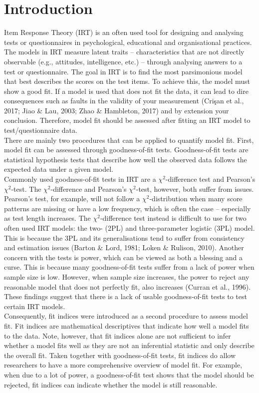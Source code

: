 \documentclass[Royal,sageapa,times,doublespace]{sagej}
\begin{document}
\section{Introduction}
Item Response Theory (IRT) is an often used tool for designing and analysing tests or questionnaires in psychological, educational and organisational practices. The models in IRT measure latent traits -- characteristics that are not directly observable (e.g., attitudes, intelligence, etc.) -- through analysing answers to a test or questionnaire. The goal in IRT is to find the most parsimonious model that best describes the scores on the test items. To achieve this, the model must show a good fit. If a model is used that does not fit the data, it can lead to dire consequences such as faults in the validity of your measurement (Cri\c{s}an et al., 2017; Jiao \& Lau, 2003; Zhao \& Hambleton, 2017) and by extension your conclusion. Therefore, model fit should be assessed after fitting an IRT model to test/questionnaire data. \\
\indent There are mainly two procedures that can be applied to quantify model fit. First, model fit can be assessed through goodness-of-fit tests. Goodness-of-fit tests are statistical hypothesis tests that describe how well the observed data follows the expected data under a given model. \\
\indent Commonly used goodness-of-fit tests in IRT are a $\chi^2$-difference test and Pearson's $\chi^2$-test. The $\chi^2$-difference and Pearson's $\chi^2$-test, however, both suffer from issues. Pearson's test, for example, will not follow a $\chi^2$-distribution when many score patterns are missing or have a low frequency, which is often the case -- especially as test length increases. The $\chi^2$-difference test instead is difficult to use for two often used IRT models: the two- (2PL) and three-parameter logistic (3PL) model. This is because the 3PL and its generalisations tend to suffer from consistency and estimation issues (Barton \& Lord, 1981; Loken \& Rulison, 2010). Another concern with the tests is power, which can be viewed as both a blessing and a curse. This is because many goodness-of-fit tests suffer from a lack of power when sample size is low. However, when sample size increases, the power to reject any reasonable model that does not perfectly fit, also increases (Curran et al., 1996). These findings suggest that there is a lack of usable goodness-of-fit tests to test certain IRT models. \\
\indent Consequently, fit indices were introduced as a second procedure to assess model fit. Fit indices are mathematical descriptives that indicate how well a model fits to the data. Note, however, that fit indices alone are not sufficient to infer whether a model fits well as they are not an inferential statistic and only describe the overall fit. Taken together with goodness-of-fit tests, fit indices do allow researchers to have a more comprehensive overview of model fit. For example, when due to a lot of power, a goodness-of-fit test shows that the model should be rejected, fit indices can indicate whether the model is still reasonable. \\ 
\end{document}
